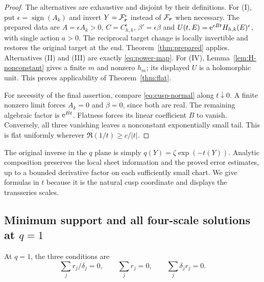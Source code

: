 \documentclass[11pt,a4paper]{article}
\numberwithin{equation}{section}
\theoremstyle{definition}\newtheorem{definition}[theorem]{Definition}
\theoremstyle{remark}\newtheorem{remark}[theorem]{Remark}
\newcommand{\vct}[1]{\boldsymbol{#1}}
\begin{document}
\begin{proof}
The alternatives are exhaustive and disjoint by their definitions.
For (I), put $\epsilon=\operatorname{sign}(A_k)$ and invert
$Y=\F_{\vct r}^{\epsilon}$ instead of $\F_{\vct r}$ when necessary.
The prepared data are $A=\epsilon A_k>0$, $C=C_{h,k}^{\epsilon}$,
$\beta'=\epsilon\beta$ and
$U(t,E)=\mathrm e^{\epsilon Bt}H_{h,k}(E)^{\epsilon}$, with single action
$a>0$. The reciprocal target change is locally invertible and restores
the original target at the end. Theorem~\ref{thm:prepared} applies.
Alternatives (II) and (III) are exactly \eqref{eq:power-map}.
For (IV), Lemma~\ref{lem:H-nonconstant} gives a finite $m$ and nonzero
$h_m$; its displayed $U$ is a holomorphic unit. This proves applicability
of Theorem~\ref{thm:flat}.

For necessity of the final assertion, compare \eqref{eq:cusp-normal}
along $t\downarrow0$. A finite nonzero limit forces $A_k=0$ and
$\beta=0$, since both are real. The remaining algebraic factor is
$\mathrm e^{Bt}$. Flatness forces its linear coefficient $B$ to vanish.
Conversely, all three vanishing leaves a nonconstant exponentially small
tail. This is flat uniformly wherever $\Re(1/t)\ge c/|t|$.
\end{proof}

The original inverse in the $q$ plane is simply
$q(Y)=\zeta\exp(-t(Y))$. Analytic composition preserves the local sheet
information and the proved error estimates, up to a bounded derivative
factor on each sufficiently small chart. We give formulas in $t$ because
it is the natural cusp coordinate and displays the transseries scales.

\subsection{Minimum support and all four-scale solutions at \texorpdfstring{$q=1$}{q=1}}
At $q=1$, the three conditions are
\begin{equation}\label{eq:flat-q1}
 \sum_j r_j/\delta_j=0,\qquad
 \sum_jr_j=0,\qquad \sum_j\delta_jr_j=0.
\end{equation}
\end{document}
